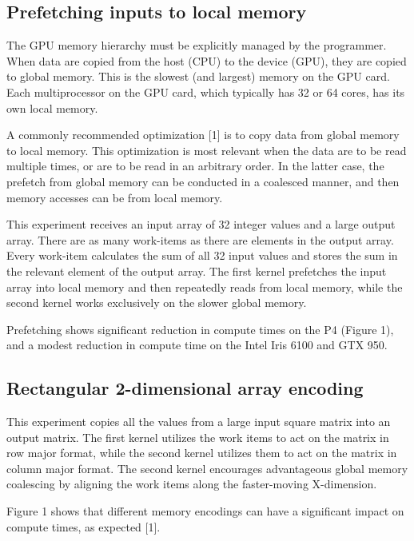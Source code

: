 \documentclass[conference]{IEEEtran}
\begin{document}
\subsection{Prefetching inputs to local memory}
The GPU memory hierarchy must be explicitly managed by the programmer. When data are copied from the host (CPU) to the device (GPU), they are copied to global memory. This is the slowest (and largest) memory on the GPU card. Each multiprocessor on the GPU card, which typically has 32 or 64 cores, has its own local memory.

A commonly recommended optimization [1] is to copy data from global memory to local memory. This optimization is most relevant when the data are to be read multiple times, or are to be read in an arbitrary order. In the latter case, the prefetch from global memory can be conducted in a coalesced manner, and then memory accesses can be from local memory.

This experiment receives an input array of 32 integer values and a large output array. There are as many work-items as there are elements in the output array. Every work-item calculates the sum of all 32 input values and stores the sum in the relevant element of the output array. The first kernel prefetches the input array into local memory and then repeatedly reads from local memory, while the second kernel works exclusively on the slower global memory.

Prefetching shows significant reduction in compute times on the P4 (Figure 1), and a modest reduction in compute time on the Intel Iris 6100 and GTX 950.


\subsection{Rectangular 2-dimensional array encoding}
This experiment copies all the values from a large input square matrix into an output matrix. The first kernel utilizes the work items to act on the matrix in row major format, while the second kernel utilizes them to act on the matrix in column major format. The second kernel encourages advantageous global memory coalescing by aligning the work items along the faster-moving X-dimension.	

Figure 1 shows that different memory encodings can have a significant impact on compute times, as expected [1].
\end{document}
